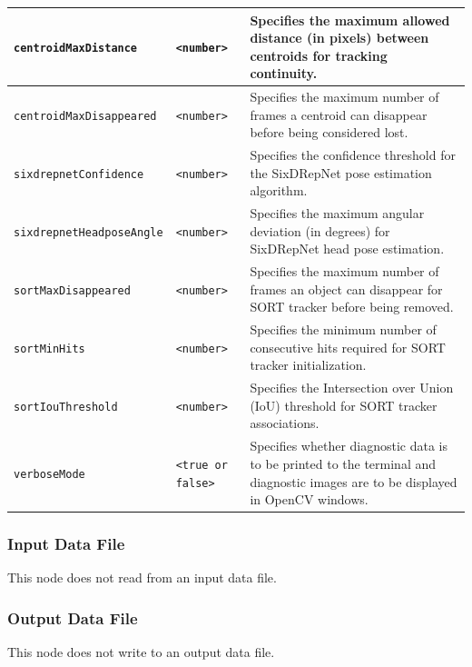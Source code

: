 \documentclass{CSSRforAfrica}
\begin{document}
{\begin{center}
\begin{tabularx}{\linewidth}{| l | l | X|}
\hline
{\footnotesize \texttt{centroidMaxDistance} }  & {\footnotesize \texttt{<number>}}     & {\small Specifies the maximum allowed distance (in pixels) between centroids for tracking continuity.} \\
\hline
{\footnotesize \texttt{centroidMaxDisappeared} }  & {\footnotesize \texttt{<number>}}     & {\small Specifies the maximum number of frames a centroid can disappear before being considered lost.} \\
\hline
{\footnotesize \texttt{sixdrepnetConfidence} }  & {\footnotesize \texttt{<number>}}     & {\small Specifies the confidence threshold for the SixDRepNet pose estimation algorithm.} \\
\hline
{\footnotesize \texttt{sixdrepnetHeadposeAngle} }  & {\footnotesize \texttt{<number>}}     & {\small Specifies the maximum angular deviation (in degrees) for SixDRepNet head pose estimation.} \\
\hline
{\footnotesize \texttt{sortMaxDisappeared}}  & {\footnotesize \texttt{<number>}}     & {\small Specifies the maximum number of frames an object can disappear for SORT tracker before being removed.} \\
\hline
{\footnotesize \texttt{sortMinHits}}  & {\footnotesize \texttt{<number>}}     & {\small Specifies the minimum number of consecutive hits required for SORT tracker initialization.} \\
\hline
{\footnotesize \texttt{sortIouThreshold}}  & {\footnotesize \texttt{<number>}}     & {\small Specifies the Intersection over Union (IoU) threshold for SORT tracker associations.} \\
\hline
{\footnotesize \texttt{verboseMode}}  & {\footnotesize \texttt{<true or false>}}     & {\small Specifies whether diagnostic data is to be printed to the terminal and diagnostic images are to be displayed in OpenCV windows.} \\
\hline
\end{tabularx}
\end{center}


\subsubsection*{Input Data File}
This node does not read from an input data file.


\subsubsection*{Output Data File}
This node does not write to an output data file.

}
\end{document}
